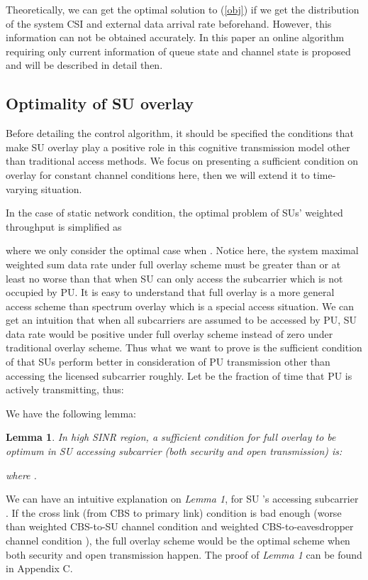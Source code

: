 \documentclass[journal]{IEEEtran}
\newtheorem{Lemma}{Lemma}
\begin{document}
Theoretically, we can get the optimal solution to (\ref{obj}) if we get the  distribution of the system CSI and external
data arrival rate beforehand. However, this information can not be obtained accurately. In this paper
an online algorithm requiring only current information of queue state and channel state is proposed and will be described
in detail then.
\subsection{Optimality of SU overlay}
Before detailing the control algorithm, it should be specified the conditions that make SU overlay play a positive role
in this cognitive transmission model other than traditional access methods. We focus on presenting a sufficient condition
on overlay for constant channel conditions here, then we will extend it to time-varying situation.

In the case of static network condition, the optimal problem of SUs' weighted throughput is simplified as

where we only consider the optimal case when .  Notice here, the system maximal weighted sum
data rate under full overlay scheme must be greater than or at least no worse than that when SU can only access the
subcarrier which is not occupied by PU. It is easy to understand that full overlay is a more general access
scheme than spectrum overlay which is a special access situation. We can get an intuition that when all subcarriers are assumed
to be accessed by PU, SU data rate would be  positive under full overlay scheme instead of zero under
traditional overlay scheme.  Thus what we want to prove is the sufficient condition of that SUs perform better in
consideration of PU transmission other than accessing the licensed subcarrier roughly. Let  be the fraction of time
that PU is
actively transmitting, thus:


We have the following lemma:
\begin{Lemma}
In high SINR region, a sufficient condition for full overlay to be optimum in SU  accessing subcarrier  (both
security and open transmission) is:

where .
\end{Lemma}

We can have an intuitive explanation on  \emph{Lemma 1}, for SU 's accessing subcarrier . If the cross link (from
CBS to primary link) condition is bad enough (worse than weighted CBS-to-SU channel condition  and weighted
CBS-to-eavesdropper channel condition ), the full overlay scheme would be the optimal scheme when both security
and open transmission happen. The proof of \emph{Lemma 1} can be found in Appendix C.
\end{document}
